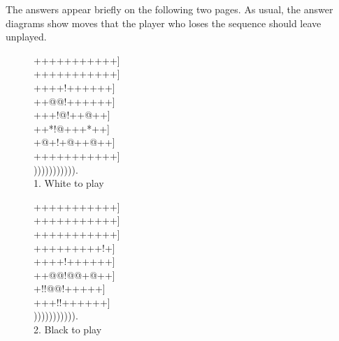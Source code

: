 \documentclass[mcrownvopaper,10pt,twopage,onecolumn,final]{memoir}
\begin{document}
The answers appear briefly on the following two pages. As usual, the
answer diagrams show moves that the player who loses the sequence
should leave unplayed.
\begin{figure}[ht]
    \begin{minipage}[c]{0.5\linewidth}
        \centering    
        {\gnos%
        +++++++++++]\\
        +++++++++++]\\
        ++++!++++++]\\
        ++@@!++++++]\\
        +++!@!++@++]\\
        ++*!@+++*++]\\
        +@+!+@++@++]\\
        +++++++++++]\\
        ))))))))))).\\
        }
        1. White to play
    \end{minipage}%
    \begin{minipage}[c]{0.5\linewidth}
        \centering    
        {\gnos%
        +++++++++++]\\
        +++++++++++]\\
        +++++++++++]\\
        +++++++++!+]\\
        ++++!++++++]\\
        ++@@!@@+@++]\\
        +!!@@!+++++]\\
        +++!!++++++]\\
        ))))))))))).\\
        }
        2. Black to play
    \end{minipage}
\end{figure}
\end{document}
